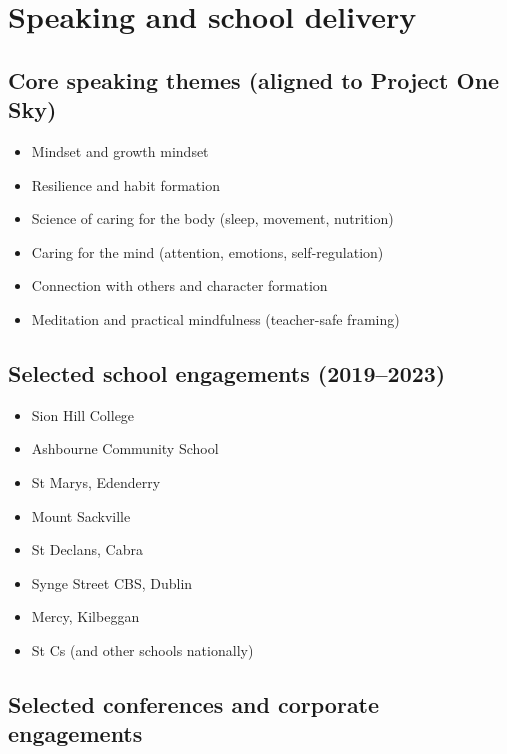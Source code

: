 \documentclass[11pt,a4paper]{article}
\begin{document}
\section{Speaking and school delivery}

\subsection{Core speaking themes (aligned to Project One Sky)}

\begin{itemize}
  \item Mindset and growth mindset
  \item Resilience and habit formation
  \item Science of caring for the body (sleep, movement, nutrition)
  \item Caring for the mind (attention, emotions, self-regulation)
  \item Connection with others and character formation
  \item Meditation and practical mindfulness (teacher-safe framing)
\end{itemize}

\subsection{Selected school engagements (2019--2023)}

\begin{itemize}
  \item Sion Hill College
  \item Ashbourne Community School
  \item St Mary\textquotesingle s, Edenderry
  \item Mount Sackville
  \item St Declan\textquotesingle s, Cabra
  \item Synge Street CBS, Dublin
  \item Mercy, Kilbeggan
  \item St C\textquotesingle s (and other schools nationally)
\end{itemize}

\subsection{Selected conferences and corporate engagements}
\end{document}
